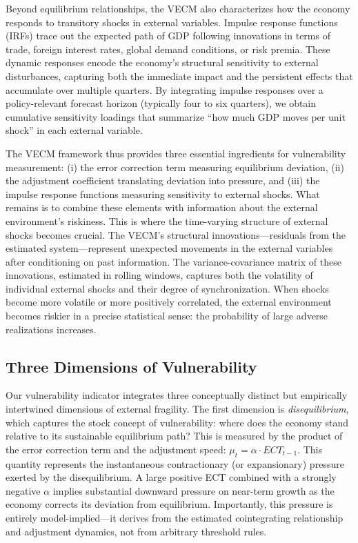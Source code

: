 \documentclass[12pt,a4paper]{article}
\numberwithin{equation}{section}
\theoremstyle{definition}
\theoremstyle{remark}
\begin{document}
Beyond equilibrium relationships, the VECM also characterizes how the economy responds to transitory shocks in external variables. Impulse response functions (IRFs) trace out the expected path of GDP following innovations in terms of trade, foreign interest rates, global demand conditions, or risk premia. These dynamic responses encode the economy's structural sensitivity to external disturbances, capturing both the immediate impact and the persistent effects that accumulate over multiple quarters. By integrating impulse responses over a policy-relevant forecast horizon (typically four to six quarters), we obtain cumulative sensitivity loadings that summarize ``how much GDP moves per unit shock'' in each external variable.

The VECM framework thus provides three essential ingredients for vulnerability measurement: (i) the error correction term measuring equilibrium deviation, (ii) the adjustment coefficient translating deviation into pressure, and (iii) the impulse response functions measuring sensitivity to external shocks. What remains is to combine these elements with information about the external environment's riskiness. This is where the time-varying structure of external shocks becomes crucial. The VECM's structural innovations---residuals from the estimated system---represent unexpected movements in the external variables after conditioning on past information. The variance-covariance matrix of these innovations, estimated in rolling windows, captures both the volatility of individual external shocks and their degree of synchronization. When shocks become more volatile or more positively correlated, the external environment becomes riskier in a precise statistical sense: the probability of large adverse realizations increases.


\subsection{Three Dimensions of Vulnerability}

Our vulnerability indicator integrates three conceptually distinct but empirically intertwined dimensions of external fragility. The first dimension is \textit{disequilibrium}, which captures the stock concept of vulnerability: where does the economy stand relative to its sustainable equilibrium path? This is measured by the product of the error correction term and the adjustment speed: $\mu_t = \alpha \cdot ECT_{t-1}$. This quantity represents the instantaneous contractionary (or expansionary) pressure exerted by the disequilibrium. A large positive ECT combined with a strongly negative $\alpha$ implies substantial downward pressure on near-term growth as the economy corrects its deviation from equilibrium. Importantly, this pressure is entirely model-implied---it derives from the estimated cointegrating relationship and adjustment dynamics, not from arbitrary threshold rules.
\end{document}
